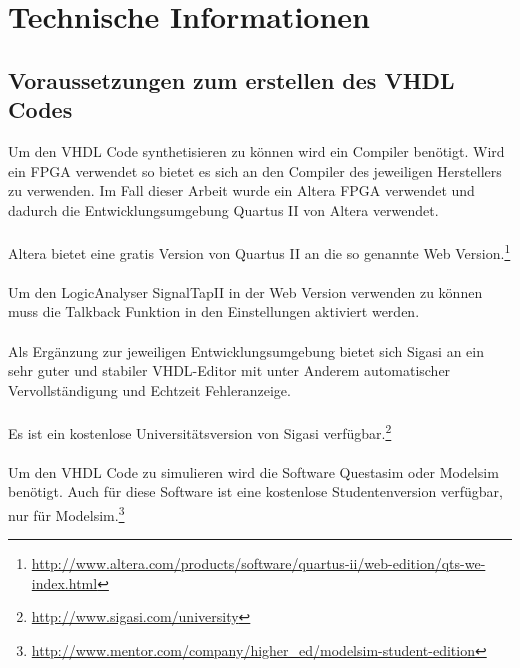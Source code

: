 \chapter{Technische Informationen}
\label{ch:TechnischeInfos}

\newcommand*{\checkbox}{{\fboxsep 1pt%
\framebox[1.30\height]{\vphantom{M}\checkmark}}}


\section{Voraussetzungen zum erstellen des VHDL Codes}

Um den VHDL Code synthetisieren zu können wird ein Compiler benötigt.
Wird ein FPGA verwendet so bietet es sich an den Compiler des jeweiligen Herstellers zu verwenden.
Im Fall dieser Arbeit wurde ein Altera FPGA verwendet und dadurch die Entwicklungsumgebung Quartus II von Altera verwendet.
\\\\Altera bietet eine gratis Version von Quartus II an die so genannte Web Version.\footnote{\url{http://www.altera.com/products/software/quartus-ii/web-edition/qts-we-index.html}}
\\\\Um den LogicAnalyser SignalTapII in der Web Version verwenden zu können muss die Talkback Funktion in den Einstellungen aktiviert werden.
\\\\Als Ergänzung zur jeweiligen Entwicklungsumgebung bietet sich Sigasi an ein sehr guter und stabiler VHDL-Editor mit unter Anderem automatischer Vervollständigung und Echtzeit Fehleranzeige.
\\\\Es ist ein kostenlose Universitätsversion von Sigasi verfügbar.\footnote{\url{http://www.sigasi.com/university}}
\\\\Um den VHDL Code zu simulieren wird die Software Questasim oder Modelsim benötigt.
Auch für diese Software ist eine kostenlose Studentenversion verfügbar, nur für Modelsim.\footnote{\url{http://www.mentor.com/company/higher_ed/modelsim-student-edition}}

